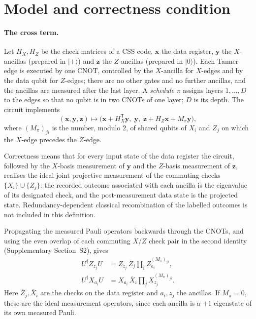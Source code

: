 \documentclass[reprint,twocolumn,superscriptaddress,nofootinbib]{revtex4-2}
\theoremstyle{plain}
\begin{document}
\section{Model and correctness condition}
\label{sec:model}

\paragraph*{The cross term.}
Let $H_X,H_Z$ be the check matrices of a CSS code, $\mathbf{x}$ the data
register, $\mathbf{y}$ the $X$-ancillas (prepared in $|+\rangle$) and
$\mathbf{z}$ the $Z$-ancillas (prepared in $|0\rangle$). Each Tanner edge
is executed by one CNOT, controlled by the $X$-ancilla for $X$-edges and by
the data qubit for $Z$-edges; there are no other gates and no further
ancillas, and the ancillas are measured after the last layer. A
\emph{schedule} $\pi$ assigns layers $1,\dots,D$ to the edges so that no
qubit is in two CNOTs of one layer; $D$ is its depth. The circuit implements
\begin{equation}
(\mathbf{x},\mathbf{y},\mathbf{z})\mapsto
\bigl(\mathbf{x}+H_X^{\mathsf T}\mathbf{y},\;\mathbf{y},\;
\mathbf{z}+H_Z\mathbf{x}+M_\pi\mathbf{y}\bigr),
\label{eq:se-map}
\end{equation}
where $(M_\pi)_{ji}$ is the number, modulo $2$, of shared qubits of $X_i$
and $Z_j$ on which the $X$-edge precedes the $Z$-edge.

Correctness means that for every input state of the data register the
circuit, followed by the $X$-basis measurement of $\mathbf{y}$ and the
$Z$-basis measurement of $\mathbf{z}$, realises the ideal joint projective
measurement of the commuting checks $\{X_i\}\cup\{Z_j\}$: the recorded
outcome associated with each ancilla is the eigenvalue of its designated
check, and the post-measurement data state is the projected state.
Redundancy-dependent classical recombination of the labelled outcomes is
not included in this definition.

Propagating the measured Pauli operators backwards through the CNOTs, and
using the even overlap of each commuting $X$/$Z$ check pair in the second
identity (Supplementary Section~S2), gives
\begin{equation}
\begin{aligned}
U^\dagger Z_{z_j} U
  &= Z_{z_j}\,\overline{Z}_j
     \prod_i Z_{a_i}^{(M_\pi)_{ji}}, \\
U^\dagger X_{a_i} U
  &= X_{a_i}\,\overline{X}_i
     \prod_j X_{z_j}^{(M_\pi)_{ji}} .
\end{aligned}
\label{eq:heisenberg}
\end{equation}
Here $\overline{Z}_j,\overline{X}_i$ are the checks on the data register
and $a_i,z_j$ the ancillas. If $M_\pi=0$, these are the ideal measurement
operators, since each ancilla is a $+1$ eigenstate of its own measured
Pauli.
\end{document}
